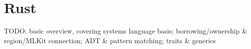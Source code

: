 
\section{Rust}
\label{sec:rust}

TODO: basic overview, covering systems language basis; borrowing/ownership \& region/MLKit connection; ADT \& pattern matching; traits \& generics



